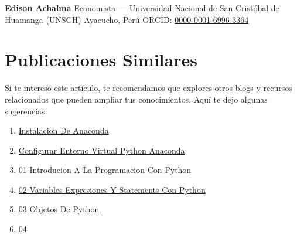 \documentclass[
  doc,
  floatsintext,
  longtable,
  a4paper,
  nolmodern,
  notxfonts,
  notimes,
  12pt,
  colorlinks=true,linkcolor=blue,citecolor=blue,urlcolor=blue]{apa7}
\providecommand{\tightlist}{%
  \setlength{\itemsep}{0pt}\setlength{\parskip}{0pt}}
\begin{document}
\textbf{Edison Achalma} Economista --- Universidad Nacional de San
Cristóbal de Huamanga (UNSCH) Ayacucho, Perú ORCID:
\href{https://orcid.org/0000-0001-6996-3364}{0000-0001-6996-3364}

\section{Publicaciones Similares}\label{publicaciones-similares}

Si te interesó este artículo, te recomendamos que explores otros blogs y
recursos relacionados que pueden ampliar tus conocimientos. Aquí te dejo
algunas sugerencias:

\begin{enumerate}
\def\labelenumi{\arabic{enumi}.}
\tightlist
\item
  \href{https://numerus-scriptum.netlify.app/python/2020-06-19-instalacion-de-anaconda/index.pdf}{}
  \href{https://numerus-scriptum.netlify.app/python/2020-06-19-instalacion-de-anaconda}{Instalacion
  De Anaconda}
\item
  \href{https://numerus-scriptum.netlify.app/python/2020-06-20-configurar-entorno-virtual-python-anaconda/index.pdf}{}
  \href{https://numerus-scriptum.netlify.app/python/2020-06-20-configurar-entorno-virtual-python-anaconda}{Configurar
  Entorno Virtual Python Anaconda}
\item
  \href{https://numerus-scriptum.netlify.app/python/2021-04-17-01-introducion-a-la-programacion-con-python/index.pdf}{}
  \href{https://numerus-scriptum.netlify.app/python/2021-04-17-01-introducion-a-la-programacion-con-python}{01
  Introducion A La Programacion Con Python}
\item
  \href{https://numerus-scriptum.netlify.app/python/2021-05-31-02-variables-expresiones-y-statements-con-python/index.pdf}{}
  \href{https://numerus-scriptum.netlify.app/python/2021-05-31-02-variables-expresiones-y-statements-con-python}{02
  Variables Expresiones Y Statements Con Python}
\item
  \href{https://numerus-scriptum.netlify.app/python/2021-06-07-03-objetos-de-python/index.pdf}{}
  \href{https://numerus-scriptum.netlify.app/python/2021-06-07-03-objetos-de-python}{03
  Objetos De Python}
\item
  \href{https://numerus-scriptum.netlify.app/python/2021-06-14-04-ejecucion-condicional-con-python/index.pdf}{}
  \href{https://numerus-scriptum.netlify.app/python/2021-06-14-04-ejecucion-condicional-con-python}{04
}
\end{enumerate}
\end{document}
